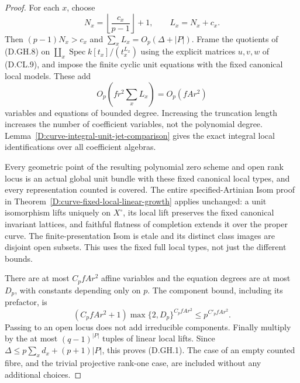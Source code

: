 \begin{proof}
For each \(x\), choose
\[
 N_x=\left\lfloor\frac{c_x}{p-1}\right\rfloor+1,
 \qquad L_x=N_x+c_x .
                                                        \tag{D.GH.10}
\]
Then \((p-1)N_x>c_x\) and
\(\sum_xL_x=O_p(\Delta+|P|)\).
Frame the quotients of (D.GH.8) on
\(\coprod_x\operatorname{Spec}k[t_x]/(t_x^{L_x})\)
using the explicit matrices \(u,v,w\) of (D.CL.9),
and impose the finite cyclic unit equations with the
fixed canonical local models. These add
\[
                  O_p\!\left(fr^2\sum_xL_x\right)
                         =O_p(f A r^2)                \tag{D.GH.11}
\]
variables and equations of bounded degree.
Increasing the truncation length increases the number
of coefficient variables, not the polynomial degree.
Lemma~\ref{D:curve-integral-unit-jet-comparison}
gives the exact integral local identifications over
all coefficient algebras.

Every geometric point of the resulting polynomial
zero scheme and open rank locus is an actual global
unit bundle with these fixed canonical local types,
and every representation counted is covered.
The entire specified-Artinian Isom proof in
Theorem~\ref{D:curve-fixed-local-linear-growth}
applies unchanged: a unit isomorphism lifts uniquely
on \(X^\circ\), its local lift preserves the fixed
canonical invariant lattices, and faithful flatness
of completion extends it over the proper curve.
The finite-presentation Isom is etale and its distinct
class images are disjoint open subsets. This uses
the fixed full local types, not just the different
bounds.

There are at most \(C_p f A r^2\) affine variables
and the equation degrees are at most \(D_p\), with
constants depending only on \(p\).
The component bound, including its prefactor, is
\[
 (C_p f A r^2+1)\max\{2,D_p\}^{C_p f A r^2}
                         \le p^{C'_p f A r^2}.         \tag{D.GH.12}
\]
Passing to an open locus does not add irreducible
components. Finally multiply by the at most
\((q-1)^{|P|}\) tuples of linear local lifts.
Since \(\Delta\le p\sum_xd_x+(p+1)|P|\),
this proves (D.GH.1). The case of an empty counted
fibre, and the trivial projective rank-one case,
are included without any additional choices.
\end{proof}

